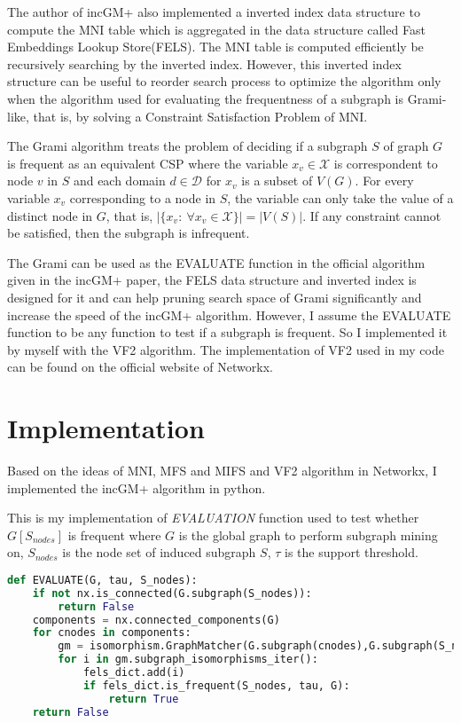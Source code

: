 \documentclass[a4paper, 12pt]{report}
\begin{document}
The author of incGM+ also implemented a inverted index data structure to compute the MNI table which is aggregated in the data structure called Fast Embeddings Lookup Store(FELS)\cite{incGM}. The MNI table is computed efficiently be recursively searching by the inverted index. However, this inverted index structure can be useful to reorder search process to optimize the algorithm only when the algorithm used for evaluating the frequentness of a subgraph is
Grami-like\cite{grami}, that is, by solving a Constraint Satisfaction Problem of MNI.

The Grami algorithm\cite{grami} treats the problem of deciding if a subgraph $S$ of graph $G$ is frequent as an equivalent CSP where the variable $x_v\in \mathcal X$ is correspondent to node $v$ in $S$ and each domain $d\in\mathcal D$ for $x_v$ is a subset of $V(G)$. For every variable $x_v$ corresponding to a node in $S$, the variable can only take the value of a distinct node in $G$, that is, $|\{x_v:\ \forall x_v\in \mathcal X\}|=|V(S)|$. If any constraint cannot be satisfied, then the subgraph is infrequent.

The Grami can be used as the EVALUATE function in the official algorithm given in the incGM+ paper, the FELS data structure and inverted index is designed for it and can help pruning search space of Grami significantly and increase the speed of the incGM+ algorithm. However, I assume the EVALUATE function to be any function to test if a subgraph is frequent. So I implemented it by myself with the VF2 algorithm\cite{VF2}. The implementation of VF2 used in my code can be found
on the official website of Networkx.

\chapter {Implementation}
Based on the ideas of MNI, MFS and MIFS and VF2 algorithm in Networkx, I implemented the incGM+ algorithm in python.

This is my implementation of \emph{EVALUATION} function used to test whether $G[S_{nodes}]$ is frequent where $G$ is the global graph to perform subgraph mining on, $S_{nodes}$ is the node set of induced subgraph $S$, $\tau$ is the support threshold.
\begin{lstlisting}[language=python, frame=single]
def EVALUATE(G, tau, S_nodes):
    if not nx.is_connected(G.subgraph(S_nodes)):
        return False
    components = nx.connected_components(G)
    for cnodes in components:
        gm = isomorphism.GraphMatcher(G.subgraph(cnodes),G.subgraph(S_nodes))
        for i in gm.subgraph_isomorphisms_iter():
            fels_dict.add(i)
            if fels_dict.is_frequent(S_nodes, tau, G):
                return True
    return False
\end{lstlisting}
\end{document}
